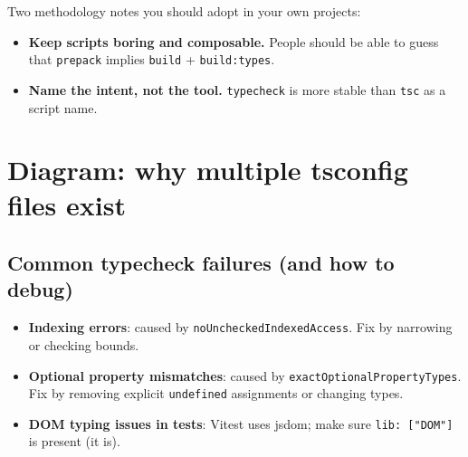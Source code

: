 Two methodology notes you should adopt in your own projects:

\begin{itemize}
\item \textbf{Keep scripts boring and composable.} People should be able to guess that \texttt{prepack} implies \texttt{build} + \texttt{build:types}.
\item \textbf{Name the intent, not the tool.} \texttt{typecheck} is more stable than \texttt{tsc} as a script name.
\end{itemize}

\section*{Diagram: why multiple tsconfig files exist}
\begin{center}
\end{center}

\subsection{Common typecheck failures (and how to debug)}

\begin{itemize}
\item \textbf{Indexing errors}: caused by \texttt{noUncheckedIndexedAccess}. Fix by narrowing or checking bounds.
\item \textbf{Optional property mismatches}: caused by \texttt{exactOptionalPropertyTypes}. Fix by removing explicit \texttt{undefined} assignments or changing types.
\item \textbf{DOM typing issues in tests}: Vitest uses jsdom; make sure \texttt{lib: ["DOM"]} is present (it is).
\end{itemize}

